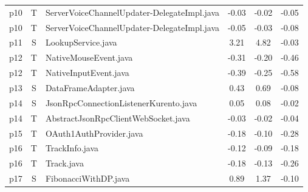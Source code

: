 \begin{table}
\begin{tabularx}{\textwidth}{ccp{5.1cm}ccc@{}}
  p10 & T & ServerVoiceChannelUpdater-DelegateImpl.java & -0.03 & -0.02 & -0.05 \\
  p10 & T & ServerVoiceChannelUpdater-DelegateImpl.java & -0.05 & -0.03 & -0.08 \\
  p11 & S & LookupService.java & 3.21 & 4.82 & -0.03 \\
  p12 & T & NativeMouseEvent.java & -0.31 & -0.20 & -0.46 \\
  p12 & T & NativeInputEvent.java & -0.39 & -0.25 & -0.58 \\
  p13 & S & DataFrameAdapter.java & 0.43 & 0.69 & -0.08 \\
  p14 & S & JsonRpcConnectionListenerKurento.java & 0.05 & 0.08 & -0.02 \\
  p14 & T & AbstractJsonRpcClientWebSocket.java & -0.03 & -0.02 & -0.04 \\
  p15 & T & OAuth1AuthProvider.java & -0.18 & -0.10 & -0.28 \\
  p16 & T & TrackInfo.java & -0.12 & -0.09 & -0.18 \\
  p16 & T & Track.java & -0.18 & -0.13 & -0.26 \\
  p17 & S & FibonacciWithDP.java & 0.89 & 1.37 & -0.10 \\
  \bottomrule 
\end{tabularx}
\end{table}
\FloatBarrier